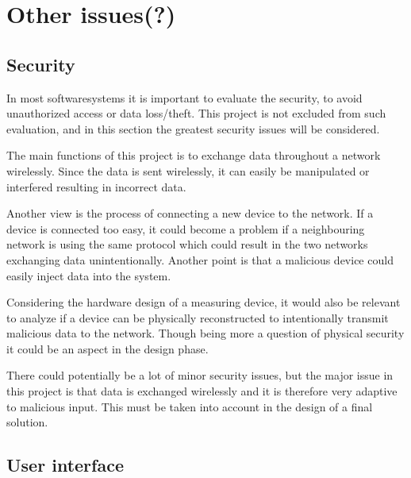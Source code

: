 \section{Other issues(?)}

\subsection{Security}
In most softwaresystems it is important to evaluate the security, to avoid unauthorized access or data loss/theft. This project is not excluded from such evaluation, and in this section the greatest security issues will be considered.

The main functions of this project is to exchange data throughout a network wirelessly. Since the data is sent wirelessly, it can easily be manipulated or interfered resulting in incorrect data.

Another view is the process of connecting a new device to the network. If a device is connected too easy, it could become a problem if a neighbouring network is using the same protocol which could result in the two networks exchanging data unintentionally. Another point is that a malicious device could easily inject data into the system.

Considering the hardware design of a measuring device, it would also be relevant to analyze if a device can be physically reconstructed to intentionally transmit malicious data to the network. Though being more a question of physical security it could be an aspect in the design phase.

There could potentially be a lot of minor security issues, but the major issue in this project is that data is exchanged wirelessly and it is therefore very adaptive to malicious input. This must be taken into account in the design of a final solution.

\subsection{User interface}